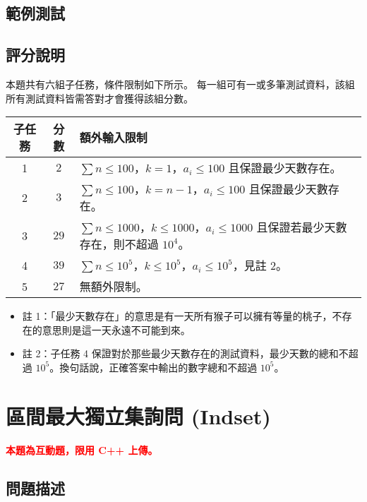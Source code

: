 \subsection{範例測試}

\begin{example}
%
\end{example}

\subsection{評分說明}

本題共有六組子任務，條件限制如下所示。
每一組可有一或多筆測試資料，該組所有測試資料皆需答對才會獲得該組分數。

\begin{longtable}[]{@{}ccl@{}}
\toprule
子任務 & 分數 & 額外輸入限制 \\
\midrule
\endhead
1 & \(2\) & \(\sum n \leq 100\)，\(k = 1\)，\(a_i \leq 100\)
且保證最少天數存在。 \\
2 & \(3\) & \(\sum n \leq 100\)，\(k = n-1\)，\(a_i \leq 100\)
且保證最少天數存在。 \\
3 & \(29\) & \(\sum n \leq 1000\)，\(k \leq 1000\)，\(a_i \leq 1000\)
且保證若最少天數存在，則不超過 \(10^4\)。 \\
4 & \(39\) &
\(\sum n \leq 10^5\)，\(k \leq 10^5\)，\(a_i \leq 10^5\)，見註 2。 \\
5 & \(27\) & 無額外限制。 \\
\bottomrule
\end{longtable}

\begin{itemize}
\tightlist
\item
  註
  1：「最少天數存在」的意思是有一天所有猴子可以擁有等量的桃子，不存在的意思則是這一天永遠不可能到來。
\item
  註 2：子任務 4
  保證對於那些最少天數存在的測試資料，最少天數的總和不超過
  \(10^5\)。換句話說，正確答案中輸出的數字總和不超過 \(10^5\)。
\end{itemize}

\section{區間最大獨立集詢問 (Indset)}

\textcolor{red}{\textbf{本題為互動題，限用 C++ 上傳。}}

\subsection{問題描述}

